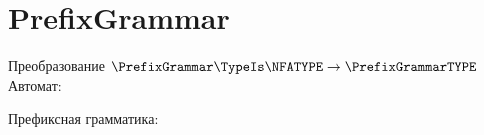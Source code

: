 \section{PrefixGrammar}
\begin{frame}{Преобразование $\PrefixGrammar\TypeIs\NFATYPE\to\PrefixGrammarTYPE$}
	Автомат:


	Префиксная грамматика:




\end{frame}
